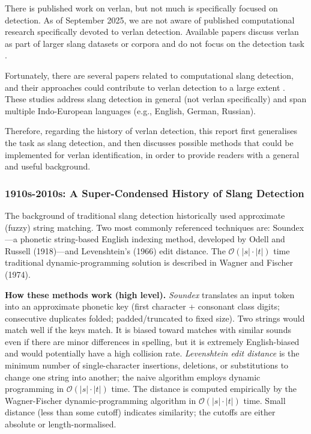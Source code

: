 \documentclass[12pt]{article}
\begin{document}
There is published work on verlan, but not much is specifically focused on detection. As of September 2025, we are not aware of published computational research specifically devoted to verlan detection. Available papers discuss verlan as part of larger slang datasets or corpora and do not focus on the detection task \cite{zurbuchen2024, podhorna2020rapcor, mekki2021tremolo, panckhurst202088milsms}.

Fortunately, there are several papers related to computational slang detection, and their approaches could contribute to verlan detection to a large extent \cite{pei2019slang, sun2024informal, slangornot2024, wu2018slangsd}. These studies address slang detection in general (not verlan specifically) and span multiple Indo-European languages (e.g., English, German, Russian).

Therefore, regarding the history of verlan detection, this report first generalises the task as slang detection, and then discusses possible methods that could be implemented for verlan identification, in order to provide readers with a general and useful background.

\subsubsection{1910s-2010s: A Super-Condensed History of Slang Detection}

The background of traditional slang detection historically used approximate (fuzzy) string matching. Two most commonly referenced techniques are: Soundex\;---\;a phonetic string-based English indexing method, developed by Odell and Russell (1918)\;---\;and Levenshtein's (1966) edit distance. The \( \mathcal{O}(|s|\cdot|t|) \) time traditional dynamic-programming solution is described in Wagner and Fischer (1974). \cite{russell1918soundex,levenshtein1966,wagner1974string}

\noindent\textbf{How these methods work (high level).} \textit{Soundex} translates an input token into an approximate phonetic key (first character + consonant class digits; consecutive duplicates folded; padded/truncated to fixed size). Two strings would match well if the keys match. It is biased toward matches with similar sounds even if there are minor differences in spelling, but it is extremely English-biased and would potentially have a high collision rate. \textit{Levenshtein edit distance} is the minimum number of single-character insertions, deletions, or substitutions to change one string into another; the naive algorithm employs dynamic programming in \( \mathcal{O}(|s|\cdot|t|) \) time. The distance is computed empirically by the Wagner-Fischer dynamic-programming algorithm in \( \mathcal{O}(|s|\cdot|t|) \) time. Small distance (less than some cutoff) indicates similarity; the cutoffs are either absolute or length-normalised. \cite{wagner1974string}
\end{document}
